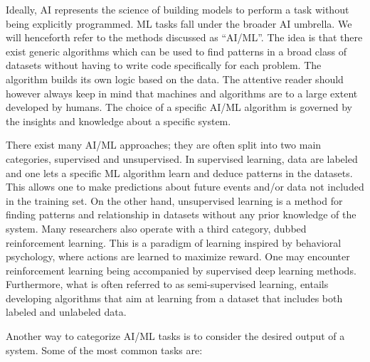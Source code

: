 \documentclass[aps,rmp,reprint,amsmath,amssymb,graphicx,longbibliography]{revtex4-1}
\begin{document}
Ideally, AI represents the science of building models to perform a
task without being explicitly programmed. ML tasks fall under the
broader AI umbrella. We will henceforth refer to the methods discussed
as ``AI/ML''. The idea is that there exist generic algorithms which
can be used to find patterns in a broad class of datasets without
having to write code specifically for each problem. The algorithm
builds its own logic based on the data. The attentive reader should
however always keep in mind that machines and algorithms are to a
large extent developed by humans. The choice of a specific AI/ML
algorithm is governed by the insights and knowledge about a specific
system.



There exist many AI/ML approaches; they are often split into two main
categories, supervised and unsupervised. In supervised learning, data
are labeled and one lets a specific ML algorithm learn and deduce
patterns in the datasets. This allows one to make predictions about
future events and/or data not included in the training set.  On the
other hand, unsupervised learning is a method for finding patterns and
relationship in datasets without any prior knowledge of the
system. Many researchers also operate with a third category, dubbed
reinforcement learning. This is a paradigm of learning inspired by
behavioral psychology, where actions are learned to maximize reward.
One may encounter reinforcement learning being accompanied by
supervised deep learning methods. Furthermore, what is often referred
to as semi-supervised learning, entails developing algorithms that aim
at learning from a dataset that includes both labeled and unlabeled
data.


Another way to categorize AI/ML tasks is to consider the desired output of a system. Some of the most common tasks are:
\makeatletter
\renewenvironment{description}%
               {\list{}{\leftmargin=10pt %
                        \labelwidth\z@ \itemindent-\leftmargin
                        \let\makelabel\descriptionlabel}}%
               {\endlist}
\makeatother
\end{document}
